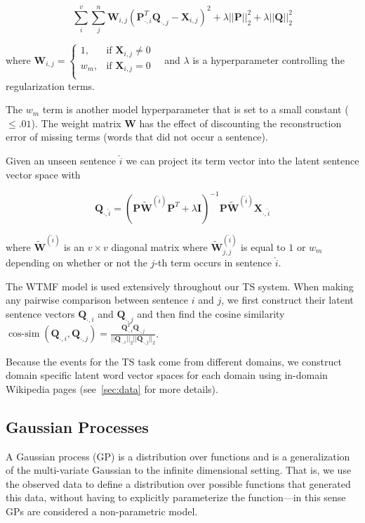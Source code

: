 \documentclass{sig-alternate}
\begin{document}
$$\sum_i^v \sum_j^n \mathbf{W}_{i,j}(\mathbf{P}_{\cdot,i}^T
\mathbf{Q}_{\cdot,j} 
- \mathbf{X}_{i,j})^2 
 + \lambda ||\mathbf{P}||_2^2 + \lambda ||\mathbf{Q}||_2^2$$

where $\mathbf{W}_{i,j} = 
\begin{cases} 1, & \textrm{if $\mathbf{X}_{i,j} \ne 0$ } \\
w_m, & \textrm{if $\mathbf{X}_{i,j} = 0$ }\\
\end{cases}$
and $\lambda$ is a hyperparameter controlling the regularization terms.

The $w_m$ term is another model hyperparameter that is set to a small constant
($\le .01$). The weight matrix $\mathbf{W}$ has the effect of discounting the
reconstruction error of missing terms (words that did not occur a sentence).

Given an unseen sentence $\hat{i}$ we can project its term vector into the
latent sentence vector space with 

$$
\mathbf{Q}_{\cdot,\hat{i}} = (\mathbf{P}\mathbf{\tilde{W}}^{(\hat{i})}
\mathbf{P}^T  + \lambda\mathbf{I} )^{-1} 
\mathbf{P}\mathbf{\tilde{W}}^{(\hat{i})} \mathbf{X}_{\cdot, \hat{i}}
$$  

where $\mathbf{\tilde{W}}^{(\hat{i})}$ is an $v\times v$ diagonal matrix
where $\mathbf{\tilde{W}}^{(\hat{i})}_{j,j}$ is equal to $1$ or $w_m$ 
depending on whether or not the $j$-th term occurs in sentence $\hat{i}$.


The WTMF model is used extensively throughout our TS system. When making any 
pairwise comparison between sentence $i$ and $j$, we first construct
their latent sentence vectors $\mathbf{Q}_{\cdot,i}$ and
$\mathbf{Q}_{\cdot,j}$ and then find the cosine similarity 
$\displaystyle \operatorname{cos-sim}
(\mathbf{Q}_{\cdot,i}, \mathbf{Q}_{\cdot,j}) = 
\frac{\mathbf{Q}_{\cdot,i}^T\mathbf{Q}_{\cdot,j}}{||\mathbf{Q}_{\cdot,i}||_2
||\mathbf{Q}_{\cdot,j}||_2   }$.


Because the events for the TS task come from different domains, we construct
domain specific latent word vector spaces for each domain using in-domain 
Wikipedia pages (see~\cref{sec:data} for more details).

\subsection{Gaussian Processes}

A Gaussian process (GP) is a distribution over functions and is a 
generalization of the multi-variate Gaussian to the infinite dimensional
setting. That is, we use the observed data to define a distribution over 
possible functions that generated this data, without having to explicitly 
parameterize the function---in this sense GPs are considered 
a non-parametric model.
\end{document}
